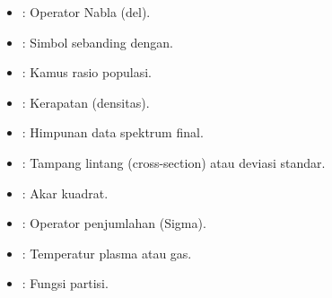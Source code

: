 \begin{itemize}[itemsep=0pt, parsep=0pt]
    \item[$\nabla$] : Operator Nabla (del).
    \item[$\propto$] : Simbol sebanding dengan.
    \item[$\mathcal{R}$] : Kamus rasio populasi.
    \item[$\rho$] : Kerapatan (densitas).
    \item[$\mathcal{S}$] : Himpunan data spektrum final.
    \item[$\sigma$] : Tampang lintang (cross-section) atau deviasi standar.
    \item[$\sqrt{}$] : Akar kuadrat.
    \item[$\sum$] : Operator penjumlahan (Sigma).
    \item[$T$] : Temperatur plasma atau gas.
    \item[$Z$] : Fungsi partisi.
\end{itemize}
